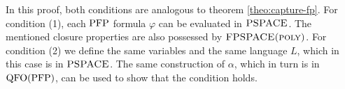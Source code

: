In this proof, both conditions are analogous to theorem \ref{theo:capture-fp}. For condition (1), each ${\rm PFP}$ formula $\varphi$ can be evaluated in $\text{\sc PSPACE}$. The mentioned closure properties are also possessed by $\text{\sc FPSPACE(poly)}$. For condition (2) we define the same variables and the same language $L$, which in this case is in $\text{\sc PSPACE}$. The same construction of $\alpha$, which in turn is in ${\rm QFO}({\rm PFP})$, can be used to show that the condition holds.